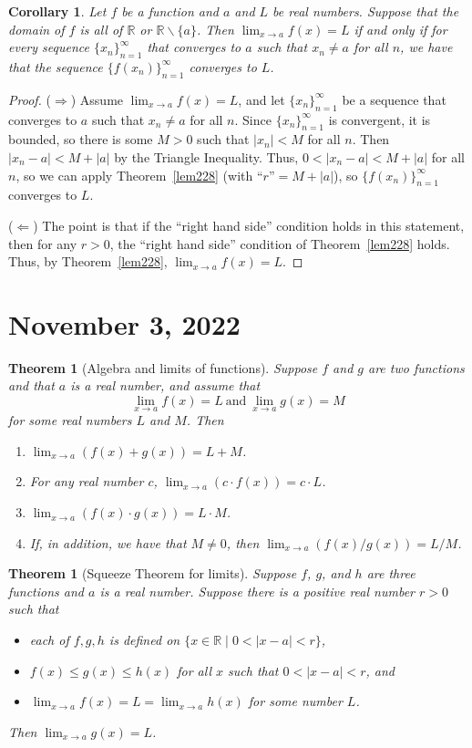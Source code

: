 \documentclass[12pt]{amsart}
\newcommand{\R}{{\mathbb{R}}}
\numberwithin{equation}{section}
\theoremstyle{plain} %
\newtheorem{thm}[equation]{Theorem}
\newtheorem{cor}[equation]{Corollary}
\newcommand{\Oct}[1]{\section{October #1, 2022}}
\newcommand{\Nov}[1]{\section{November #1, 2022}}
\theoremstyle{definition}
\theoremstyle{remark}
\begin{document}

\begin{cor}\label{cor:261} Let $f$ be a function and $a$ and $L$ be real numbers. Suppose that the domain of $f$ is all of $\R$ or $\R \smallsetminus \{ a\}$. Then $\lim_{x \to a} f(x) = L$ if and only if for every sequence 
	$\{x_n\}_{n=1}^\infty$ that converges to $a$ such that $x_n\neq a$ for all $n$, we have that the sequence $\{f(x_n)\}_{n=1}^\infty$ converges to $L$. 
\end{cor}
\begin{proof}
	($\Rightarrow$) Assume $\lim_{x \to a} f(x) = L$, and let $\{x_n\}_{n=1}^\infty$ be a sequence that converges to $a$ such that $x_n\neq a$ for all $n$. Since $\{x_n\}_{n=1}^\infty$ is convergent, it is bounded, so there is some $M>0$ such that $|x_n|<M$ for all $n$. Then $|x_n - a|<M+|a|$ by the Triangle Inequality. Thus, $0<|x_n - a|<M+|a|$ for all $n$, so we can apply Theorem~\ref{lem228} (with ``$r$''$=M+|a|$), so $\{f(x_n)\}_{n=1}^\infty$ converges to $L$.
	
		($\Leftarrow$) The point is that if the ``right hand side'' condition holds in this statement, then for any $r>0$, the ``right hand side'' condition of Theorem~\ref{lem228} holds.  Thus, by Theorem~\ref{lem228}, $\lim_{x \to a} f(x) = L$.
		\end{proof}



\Nov{3}

	\begin{thm}[Algebra and limits of functions]\label{thm:alglim} Suppose $f$ and $g$ are two functions and that $a$ is a real number, and
	assume  that 
	$$
	\lim_{x \to a} f(x) = L  \ \text{and} \  \lim_{x \to a} g(x) = M
	$$
	for some real numbers $L$ and $M$. Then
	\begin{enumerate}
		\item $\lim_{x \to a} (f(x) + g(x)) = L  + M$.
		\item For any real number $c$, $\lim_{x \to a} (c \cdot f(x)) = c \cdot L$.
		\item $\lim_{x \to a} (f(x) \cdot g(x)) = L \cdot M$.
		\item If, in addition, we have that $M \ne 0$,
		then $\lim_{x \to a} (f(x)/g(x)) = L/M$.
		\end{enumerate}
\end{thm}
	
	\begin{thm}[Squeeze Theorem for limits]  Suppose $f$, $g$, and $h$ are three functions and $a$ is a real number. Suppose there is a positive real number $r > 0$
	such that 
	\begin{itemize}
		\item each of $f,g,h$ is defined on $\{x \in \R \mid 0 < |x-a| < r\}$,
		\item $f(x) \leq g(x) \leq h(x)$ for all
		$x$ such that $0 < |x-a| < r$, and
		\item	$\lim_{x \to a} f(x) = L = \lim_{x \to    a} h(x)$ for some number $L$.
	\end{itemize}  
	Then $\lim_{x \to a} g(x) = L$.
\end{thm}
\end{document}
